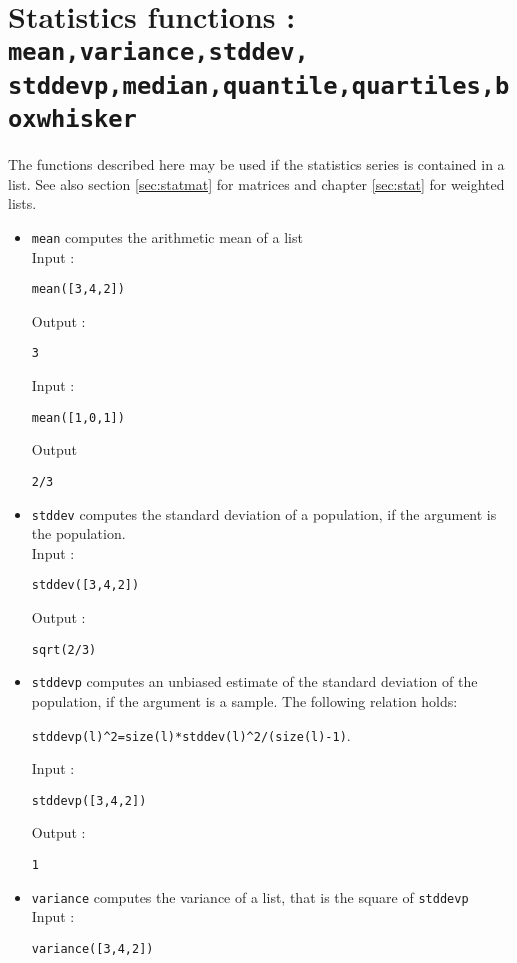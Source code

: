 \documentclass[a4paper,11pt]{book}
\begin{document}
\section{Statistics functions : {\tt mean,variance,stddev, stddevp,median,quantile,quartiles,boxwhisker}} \label{sec:statlist}
The functions described here may be used if the statistics series 
is contained in a list. See also section \ref{sec:statmat} for matrices and  
chapter \ref{sec:stat} for weighted lists.
\begin{itemize}
\item{\tt mean} computes the arithmetic mean of a list\\
Input :
\begin{center}{\tt mean([3,4,2])}\end{center}
Output :
\begin{center}{\tt  3}\end{center}
Input :
\begin{center}{\tt mean([1,0,1])}\end{center}
Output 
\begin{center}{\tt  2/3}\end{center}
\item{\tt stddev} computes the standard deviation of a population,
if the argument is the population.\\
Input :
\begin{center}{\tt stddev([3,4,2])}\end{center}
Output :
\begin{center}{\tt sqrt(2/3)}\end{center}
\item{\tt stddevp} computes an unbiased estimate of
the standard deviation of the population,
if the argument is a sample. The following
relation holds:
\begin{center}
 {\tt stddevp(l)\verb|^|2=size(l)*stddev(l)\verb|^|2/(size(l)-1)}.
\end{center}
Input :
\begin{center}{\tt stddevp([3,4,2])}\end{center}
Output :
\begin{center}{\tt 1}\end{center}
\item{\tt variance} computes the variance of a list, that is
the square of {\tt stddevp}\\
Input :
\begin{center}{\tt variance([3,4,2])}\end{center}

\end{itemize}
\end{document}

